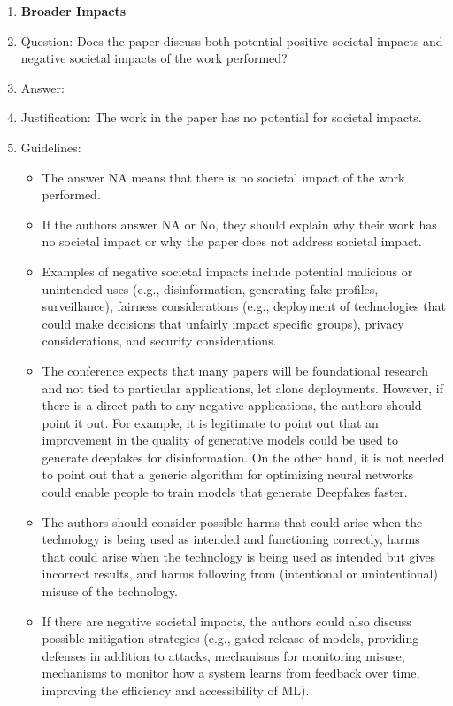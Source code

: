 \documentclass{article}
\begin{document}
\begin{enumerate}
\item {\bf Broader Impacts}
    \item[] Question: Does the paper discuss both potential positive societal impacts and negative societal impacts of the work performed?
    \item[] Answer: \answerNA{} %
    \item[] Justification: The work in the paper has no potential for societal impacts.
    \item[] Guidelines:
    \begin{itemize}
        \item The answer NA means that there is no societal impact of the work performed.
        \item If the authors answer NA or No, they should explain why their work has no societal impact or why the paper does not address societal impact.
        \item Examples of negative societal impacts include potential malicious or unintended uses (e.g., disinformation, generating fake profiles, surveillance), fairness considerations (e.g., deployment of technologies that could make decisions that unfairly impact specific groups), privacy considerations, and security considerations.
        \item The conference expects that many papers will be foundational research and not tied to particular applications, let alone deployments. However, if there is a direct path to any negative applications, the authors should point it out. For example, it is legitimate to point out that an improvement in the quality of generative models could be used to generate deepfakes for disinformation. On the other hand, it is not needed to point out that a generic algorithm for optimizing neural networks could enable people to train models that generate Deepfakes faster.
        \item The authors should consider possible harms that could arise when the technology is being used as intended and functioning correctly, harms that could arise when the technology is being used as intended but gives incorrect results, and harms following from (intentional or unintentional) misuse of the technology.
        \item If there are negative societal impacts, the authors could also discuss possible mitigation strategies (e.g., gated release of models, providing defenses in addition to attacks, mechanisms for monitoring misuse, mechanisms to monitor how a system learns from feedback over time, improving the efficiency and accessibility of ML).
    \end{itemize}
    

\end{enumerate}
\end{document}
